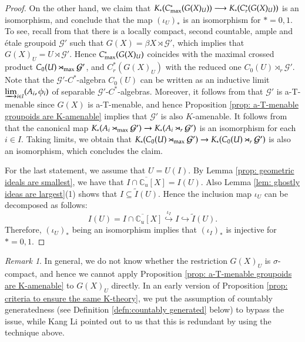\documentclass[12pt, a4paper]{amsart}
\numberwithin{equation}{section}
\theoremstyle{definition}
\theoremstyle{remark}
\newtheorem{rem}[thm]{Remark}
\def\CC{\mathbb{C}}
\def\G{\mathcal{G}}
\begin{document}
\begin{proof}
On the other hand, we claim that $K_\ast(C^*_{{\rm max}}(G(X)_U)) \longrightarrow K_\ast(C^*_r(G(X)_U))$ is an isomorphism, and conclude that the map $(\iota_U)_\ast$ is an isomorphism for $\ast=0,1$. To see, recall from \cite[Lemma 3.3]{STY02} that there is a locally compact, second countable, ample and \'{e}tale groupoid $\G'$ such that $G(X) = \beta X \rtimes \G'$, which implies that $G(X)_U = U \rtimes \G'$. Hence $C^*_{{\rm max}}(G(X)_U)$ coincides with the maximal crossed product $C_0(U) \rtimes_{{\rm max}} \G'$, and $C^*_r(G(X)_U)$ with the reduced one $C_0(U) \rtimes_{r} \G'$. Note that the $\G'$-$C^*$-algebra $C_0(U)$ can be written as an inductive limit $\varinjlim_{i\in I} (A_i, \phi_i)$ of separable $\G'$-$C^*$-algebras. Moreover, it follows from \cite[Theorem 5.4]{STY02} that $\G'$ is a-T-menable since $G(X)$ is a-T-menable, and hence Proposition \ref{prop: a-T-menable groupoids are K-amenable} implies that $\G'$ is also $K$-amenable. It follows from \cite[Proposition 4.12]{Tu99} that the canonical map $K_\ast(A_i \rtimes_{{\rm max}} \G') \rightarrow K_\ast(A_i \rtimes_{r} \G')$ is an isomorphism for each $i \in I$. Taking limits, we obtain that $K_\ast(C_0(U) \rtimes_{{\rm max}} \G') \rightarrow K_\ast(C_0(U) \rtimes_{r} \G')$ is also an isomorphism, which concludes the claim. 



For the last statement, we assume that $U=U(I)$. By Lemma \ref{prop: geometric ideals are smallest}, we have that $\overline{I \cap \CC_u[X]} = I(U)$. Also Lemma \ref{lem: ghostly ideas are largest}(1) shows that $I \subseteq \tilde{I}(U)$. Hence the inclusion map $\iota_U$ can be decomposed as follows:
\[
I(U) = \overline{I \cap \CC_u[X]} \stackrel{\iota_I}{\hookrightarrow} I \hookrightarrow \tilde{I}(U).
\]
Therefore, $(\iota_U)_\ast$ being an isomorphism implies that $(\iota_I)_\ast$ is injective for $\ast=0,1$. 
\end{proof}

\begin{rem}\label{rem:thanks to Kang}
In general, we do not know whether the restriction $G(X)_U$ is $\sigma$-compact, and hence we cannot apply Proposition \ref{prop: a-T-menable groupoids are K-amenable} to $G(X)_U$ directly. In an early version of Proposition \ref{prop: criteria to ensure the same K-theory}, we put the assumption of countably generatedness (see Definition \ref{defn:countably generated} below) to bypass the issue, while Kang Li pointed out to us that this is redundant by using the technique above. 
\end{rem}
\end{document}

